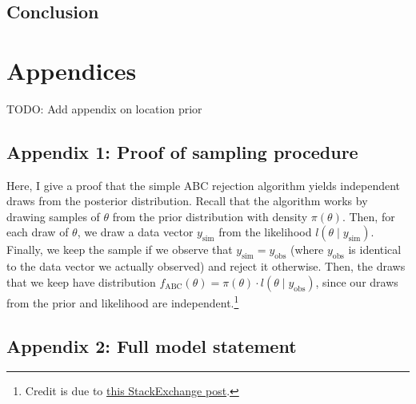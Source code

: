 \documentclass[
  oneside]{book}
\begin{document}
\hypertarget{conclusion-2}{%
\section{Conclusion}\label{conclusion-2}}

\renewcommand{\baselinestretch}{1}\normalsize

\hypertarget{appendices}{%
\chapter{Appendices}\label{appendices}}

TODO: Add appendix on location prior

\hypertarget{appendix-1-proof-of-sampling-procedure}{%
\section{Appendix 1: Proof of sampling procedure}\label{appendix-1-proof-of-sampling-procedure}}

Here, I give a proof that the simple ABC rejection algorithm yields independent draws from the posterior distribution. Recall that the algorithm works by drawing samples of \(\theta\) from the prior distribution with density \(\pi (\theta)\). Then, for each draw of \(\theta\), we draw a data vector \(y_{\text {sim}}\) from the likelihood \(l(\theta \mid y_{\text{sim}})\). Finally, we keep the sample if we observe that \(y_{\text{sim}} = y_{\text{obs}}\) (where \(y_{\text{obs}}\) is identical to the data vector we actually observed) and reject it otherwise. Then, the draws that we keep have distribution \(f_{\text{ABC}}(\theta) = \pi(\theta) \cdot l(\theta \mid y_{\text{obs}})\), since our draws from the prior and likelihood are independent.\footnote{Credit is due to \href{https://stats.stackexchange.com/questions/380076/proof-of-approximate-exact-bayesian-computation.}{this StackExchange post}.}

\hypertarget{appendix-2-full-model-statement}{%
\section{Appendix 2: Full model statement}\label{appendix-2-full-model-statement}}
\end{document}
